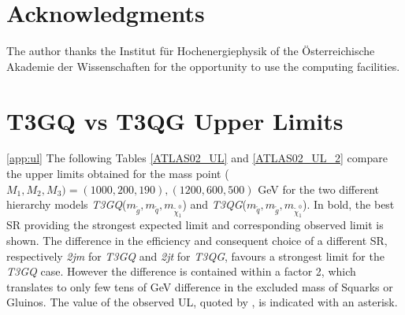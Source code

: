 \documentclass[epj,nopacs,fleqn]{svjour}
\begin{document}
%
\section*{Acknowledgments}
The author thanks the Institut f\"ur Hochenergiephysik of the \"Osterreichische Akademie der Wissenschaften for the opportunity to use the computing facilities.
%



\appendix
\ONE
\section{T3GQ vs T3QG Upper Limits}\ref{app:ul}
The following Tables \ref{ATLAS02_UL} and \ref{ATLAS02_UL_2}  compare the upper limits obtained for the mass point ($M_1,M_2,M_3) = (1000,200,190),(1200,600,500)$ GeV for the two different hierarchy models \textit{T3GQ}($m_{\tilde g}, m_{\tilde q}, m_{\tilde \chi _1 ^0 }$) and \textit{T3QG}($m_{\tilde q}, m_{\tilde g}, m_{\tilde \chi _1 ^0 }$). In bold, the best SR providing the strongest expected limit and corresponding observed limit is shown. The difference in the efficiency and consequent choice of a different SR, respectively \textit{2jm} for \textit{T3GQ} and \textit{2jt} for \textit{T3QG}, favours a strongest limit for the \textit{T3GQ} case. However the difference is contained within a factor 2, which translates to only few tens of GeV difference in the excluded mass of Squarks or Gluinos. The value of the observed UL, quoted by \SMO, is indicated with an asterisk. 
\end{document}
